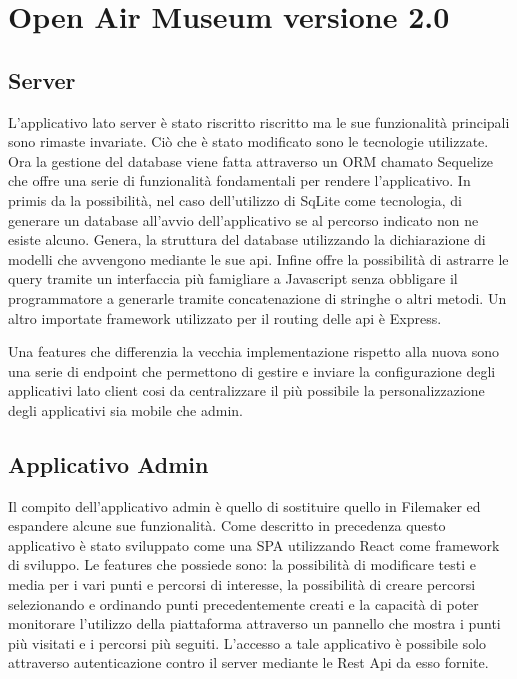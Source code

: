 \chapter{Open Air Museum versione 2.0}
\vspace{5mm}

\section{Server}\vspace{5mm}

L'applicativo lato server è stato riscritto riscritto ma le sue funzionalità principali sono rimaste invariate. Ciò che è stato modificato sono le tecnologie utilizzate. Ora la gestione del database viene fatta attraverso un ORM chamato Sequelize che offre una serie di funzionalità fondamentali per rendere l'applicativo. In primis da la possibilità, nel caso dell'utilizzo di SqLite come tecnologia, di generare un database all'avvio dell'applicativo se al percorso indicato non ne esiste alcuno. Genera, la struttura del database utilizzando la dichiarazione di modelli che avvengono mediante le sue api. Infine offre la possibilità di astrarre le query tramite un interfaccia più famigliare a Javascript senza obbligare il programmatore a generarle tramite concatenazione di stringhe o altri metodi. Un altro importate framework utilizzato per il routing delle api è Express.\vspace{5mm}

Una features che differenzia la vecchia implementazione rispetto alla nuova sono una serie di endpoint che permettono di gestire e inviare la configurazione degli applicativi lato client cosi da centralizzare il più possibile la personalizzazione degli applicativi sia mobile che admin.  

\section{Applicativo Admin}\vspace{5mm}

Il compito dell'applicativo admin è quello di sostituire quello in Filemaker ed espandere alcune sue funzionalità. Come descritto in precedenza questo applicativo è stato sviluppato come una SPA utilizzando React come framework di sviluppo. Le features che possiede sono: la possibilità di modificare testi e media per i vari punti e percorsi di interesse, la possibilità di creare percorsi selezionando e ordinando punti precedentemente creati e la capacità di poter monitorare l'utilizzo della piattaforma attraverso un pannello che mostra i punti più visitati e i percorsi più seguiti. L'accesso a tale applicativo è possibile solo attraverso autenticazione contro il server mediante le Rest Api da esso fornite.\vspace{5mm}

